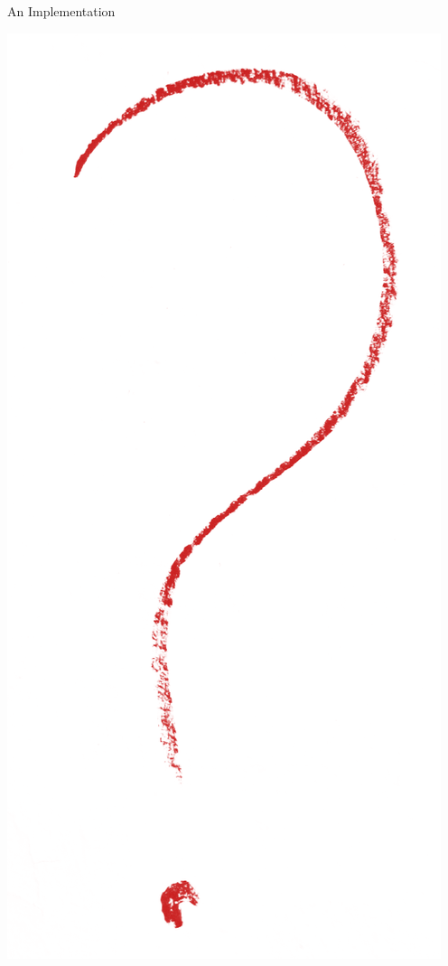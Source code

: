 \begin{frame}{An Implementation}
{\begin{minipage}{0.40\textwidth}
        \includegraphics[height=0.6\textheight]{data/flickr/questionmark-alertred}
    \end{minipage}
    }
\end{frame}
